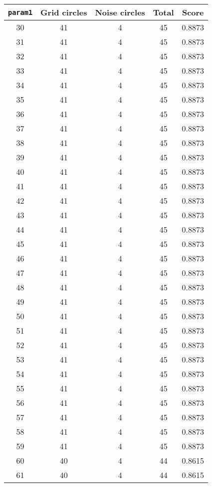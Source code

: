 \documentclass[letterpaper, 12pt]{article}
\begin{document}
\begin{longtable}{|c|c|c|c|c|}
\hline
\textbf{\texttt{param1}} & \textbf{Grid circles} & \textbf{Noise circles} & \textbf{Total} & \textbf{Score} \\
\hline
30 & 41 & 4 & 45 & 0.8873 \\
\hline
31 & 41 & 4 & 45 & 0.8873 \\
\hline
32 & 41 & 4 & 45 & 0.8873 \\
\hline
33 & 41 & 4 & 45 & 0.8873 \\
\hline
34 & 41 & 4 & 45 & 0.8873 \\
\hline
35 & 41 & 4 & 45 & 0.8873 \\
\hline
36 & 41 & 4 & 45 & 0.8873 \\
\hline
37 & 41 & 4 & 45 & 0.8873 \\
\hline
38 & 41 & 4 & 45 & 0.8873 \\
\hline
39 & 41 & 4 & 45 & 0.8873 \\
\hline
40 & 41 & 4 & 45 & 0.8873 \\
\hline
41 & 41 & 4 & 45 & 0.8873 \\
\hline
42 & 41 & 4 & 45 & 0.8873 \\
\hline
43 & 41 & 4 & 45 & 0.8873 \\
\hline
44 & 41 & 4 & 45 & 0.8873 \\
\hline
45 & 41 & 4 & 45 & 0.8873 \\
\hline
46 & 41 & 4 & 45 & 0.8873 \\
\hline
47 & 41 & 4 & 45 & 0.8873 \\
\hline
48 & 41 & 4 & 45 & 0.8873 \\
\hline
49 & 41 & 4 & 45 & 0.8873 \\
\hline
50 & 41 & 4 & 45 & 0.8873 \\
\hline
51 & 41 & 4 & 45 & 0.8873 \\
\hline
52 & 41 & 4 & 45 & 0.8873 \\
\hline
53 & 41 & 4 & 45 & 0.8873 \\
\hline
54 & 41 & 4 & 45 & 0.8873 \\
\hline
55 & 41 & 4 & 45 & 0.8873 \\
\hline
56 & 41 & 4 & 45 & 0.8873 \\
\hline
57 & 41 & 4 & 45 & 0.8873 \\
\hline
58 & 41 & 4 & 45 & 0.8873 \\
\hline
59 & 41 & 4 & 45 & 0.8873 \\
\hline
60 & 40 & 4 & 44 & 0.8615 \\
\hline
61 & 40 & 4 & 44 & 0.8615 \\

\end{longtable}
\end{document}

